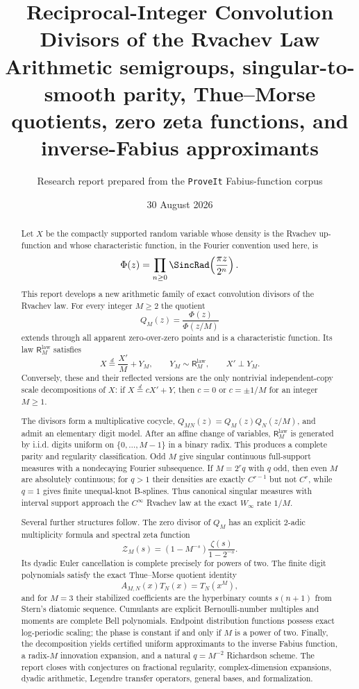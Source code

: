 \documentclass[11pt,oneside]{article}
\title{\bfseries Reciprocal-Integer Convolution Divisors of the Rvachev Law\\[0.35em]
\large Arithmetic semigroups, singular-to-smooth parity, Thue--Morse quotients, zero zeta functions, and inverse-Fabius approximants}
\author{Research report prepared from the \texttt{ProveIt} Fabius-function corpus}
\date{30 August 2026}
\theoremstyle{definition}
\theoremstyle{remark}
\newcommand{\ReciprocalIntegerLaw}[1]{\mathsf R^{\mathrm{law}}_{#1}}
\begin{document}
\maketitle

\begin{abstract}
Let $X$ be the compactly supported random variable whose density is the Rvachev
up-function and whose characteristic function, in the Fourier convention used here, is
\[
 \Phi(z)=\prod_{n\geq0}\SincRad\!\left(\frac{\pi z}{2^n}\right).
\]
This report develops a new arithmetic family of exact convolution divisors of the
Rvachev law.  For every integer $M\geq2$ the quotient
\[
 Q_M(z)=\frac{\Phi(z)}{\Phi(z/M)}
\]
extends through all apparent zero-over-zero points and is a characteristic function.  Its
law $\ReciprocalIntegerLaw{M}$ satisfies
\[
 X\overset d=\frac{X'}{M}+Y_M,
 \qquad Y_M\sim\ReciprocalIntegerLaw{M},
 \qquad X'\perp Y_M.
\]
Conversely, these and their reflected versions are the only nontrivial independent-copy
scale decompositions of $X$: if $X\overset d=cX'+Y$, then
$c=0$ or $c=\pm1/M$ for an integer $M\geq1$.

The divisors form a multiplicative cocycle,
$Q_{MN}(z)=Q_M(z)Q_N(z/M)$, and admit an elementary digit model.  After an affine
change of variables, $\ReciprocalIntegerLaw{M}$ is generated by i.i.d. digits uniform on
$\{0,\ldots,M-1\}$ in a binary radix.  This produces a complete parity and regularity
classification.  Odd $M$ give singular continuous full-support measures with a
nondecaying Fourier subsequence.  If $M=2^rq$ with $q$ odd, then even $M$ are
absolutely continuous; for $q>1$ their densities are exactly
$C^{r-1}$ but not $C^r$, while $q=1$ gives finite unequal-knot B-splines.
Thus canonical singular measures with interval support approach the $C^\infty$ Rvachev
law at the exact $W_\infty$ rate $1/M$.

Several further structures follow.  The zero divisor of $Q_M$ has an explicit
$2$-adic multiplicity formula and spectral zeta function
\[
 \mathcal Z_M(s)=(1-M^{-s})\frac{\zeta(s)}{1-2^{-s}}.
\]
Its dyadic Euler cancellation is complete precisely for powers of two.  The finite digit
polynomials satisfy the exact Thue--Morse quotient identity
\[
 A_{M,N}(x)T_N(x)=T_N(x^M),
\]
and for $M=3$ their stabilized coefficients are the hyperbinary counts
$s(n+1)$ from Stern's diatomic sequence.  Cumulants are explicit Bernoulli-number
multiples and moments are complete Bell polynomials.  Endpoint distribution functions
possess exact log-periodic scaling; the phase is constant if and only if $M$ is a power
of two.  Finally, the decomposition yields certified uniform approximants to the inverse
Fabius function, a radix-$M$ innovation expansion, and a natural $q=M^{-2}$ Richardson
scheme.  The report closes with conjectures on fractional regularity, complex-dimension
expansions, dyadic arithmetic, Legendre transfer operators, general bases, and formalization.
\end{abstract}
\end{document}
